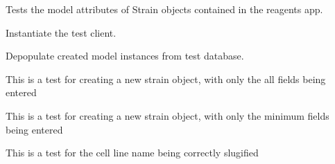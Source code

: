 \documentclass[letterpaper,10pt,english]{sphinxmanual}
\begin{document}

\begin{fulllineitems}
\label{api:experimentdb.reagents.tests.StrainModelTests}
Tests the model attributes of Strain objects contained in the reagents app.

\begin{fulllineitems}
\label{api:experimentdb.reagents.tests.StrainModelTests.setUp}
Instantiate the test client.

\end{fulllineitems}


\begin{fulllineitems}
\label{api:experimentdb.reagents.tests.StrainModelTests.tearDown}
Depopulate created model instances from test database.

\end{fulllineitems}


\begin{fulllineitems}
\label{api:experimentdb.reagents.tests.StrainModelTests.test_create_strain_all_fields}
This is a test for creating a new strain object, with only the all fields being entered

\end{fulllineitems}


\begin{fulllineitems}
\label{api:experimentdb.reagents.tests.StrainModelTests.test_create_strain_minimal}
This is a test for creating a new strain object, with only the minimum fields being entered

\end{fulllineitems}


\begin{fulllineitems}
\label{api:experimentdb.reagents.tests.StrainModelTests.test_strain_slugify}
This is a test for the cell line name being correctly slugified

\end{fulllineitems}


\end{fulllineitems}
\end{document}
